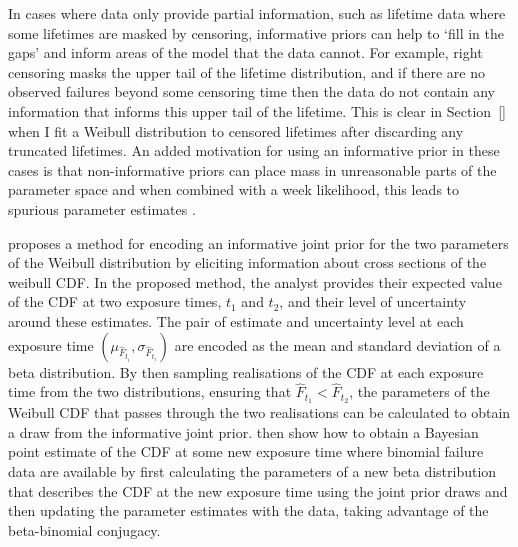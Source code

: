 In cases where data only provide partial information, such as lifetime data where some lifetimes are masked by censoring, informative priors can help to `fill in the gaps' and inform areas of the model that the data cannot. For example, right censoring masks the upper tail of the lifetime distribution, and if there are no observed failures beyond some censoring time then the data do not contain any information that informs this upper tail of the lifetime. This is clear in Section~\ref{} when I fit a Weibull distribution to censored lifetimes after discarding any truncated lifetimes. An added motivation for using an informative prior in these cases is that non-informative priors can place mass in unreasonable parts of the parameter space and when combined with a week likelihood, this leads to spurious parameter estimates \citep{tian2024}.

\citet{kaminskiy2005} proposes a method for encoding an informative joint prior for the two parameters of the Weibull distribution by eliciting information about cross sections of the weibull CDF. In the proposed method, the analyst provides their expected value of the CDF at two exposure times, $t_1$ and $t_2$, and their level of uncertainty around these estimates. The pair of estimate and uncertainty level at each exposure time $(\mu_{\hat{F}_{t_i}}, \sigma_{\hat{F}_{t_i}})$ are encoded as the mean and standard deviation of a beta distribution. By then sampling realisations of the CDF at each exposure time from the two distributions, ensuring that $\hat{F}_{t_1} < \hat{F}_{t_2}$, the parameters of the Weibull CDF that passes through the two realisations can be calculated to obtain a draw from the informative joint prior. \citet{kaminskiy2005} then show how to obtain a Bayesian point estimate of the CDF at some new exposure time where binomial failure data are available by first calculating the parameters of a new beta distribution that describes the CDF at the new exposure time using the joint prior draws and then updating the parameter estimates with the data, taking advantage of the beta-binomial conjugacy.

